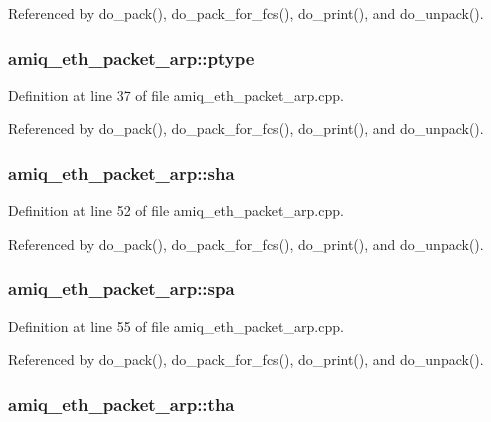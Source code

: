 Referenced by do\_\-pack(), do\_\-pack\_\-for\_\-fcs(), do\_\-print(), and do\_\-unpack().\hypertarget{classamiq__eth__packet__arp_a7a92908295901d6f1a977202a5cb0af4}{
\subsubsection[{ptype}]{ {\bf amiq\_\-eth\_\-packet\_\-arp::ptype}}}
\label{classamiq__eth__packet__arp_a7a92908295901d6f1a977202a5cb0af4}


Definition at line 37 of file amiq\_\-eth\_\-packet\_\-arp.cpp.

Referenced by do\_\-pack(), do\_\-pack\_\-for\_\-fcs(), do\_\-print(), and do\_\-unpack().\hypertarget{classamiq__eth__packet__arp_a5e72287f1472bf6abeebb375213a9ce1}{
\subsubsection[{sha}]{ {\bf amiq\_\-eth\_\-packet\_\-arp::sha}}}
\label{classamiq__eth__packet__arp_a5e72287f1472bf6abeebb375213a9ce1}


Definition at line 52 of file amiq\_\-eth\_\-packet\_\-arp.cpp.

Referenced by do\_\-pack(), do\_\-pack\_\-for\_\-fcs(), do\_\-print(), and do\_\-unpack().\hypertarget{classamiq__eth__packet__arp_abbebf95b682baec2273e44d79cecd52b}{
\subsubsection[{spa}]{ {\bf amiq\_\-eth\_\-packet\_\-arp::spa}}}
\label{classamiq__eth__packet__arp_abbebf95b682baec2273e44d79cecd52b}


Definition at line 55 of file amiq\_\-eth\_\-packet\_\-arp.cpp.

Referenced by do\_\-pack(), do\_\-pack\_\-for\_\-fcs(), do\_\-print(), and do\_\-unpack().\hypertarget{classamiq__eth__packet__arp_a68f413bad7f92628c8f5d7a4fadf04d3}{
\subsubsection[{tha}]{ {\bf amiq\_\-eth\_\-packet\_\-arp::tha}}}
\label{classamiq__eth__packet__arp_a68f413bad7f92628c8f5d7a4fadf04d3}


